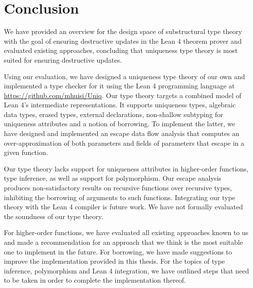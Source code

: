 \chapter{Conclusion}\label{sec:conclusion}
We have provided an overview for the design space of substructural type theory with the goal of ensuring destructive updates in the Lean 4 theorem prover and evaluated existing approaches, concluding that uniqueness type theory is most suited for ensuring destructive updates. 

Using our evaluation, we have designed a uniqueness type theory of our own and implemented a type checker for it using the Lean 4 programming language at \url{https://github.com/mhuisi/Uniq}. Our type theory targets a combined model of Lean 4's intermediate representations. It supports uniqueness types, algebraic data types, erased types, external declarations, non-shallow subtyping for uniqueness attributes and a notion of borrowing. To implement the latter, we have designed and implemented an escape data flow analysis that computes an over-approximation of both parameters and fields of parameters that escape in a given function.

Our type theory lacks support for uniqueness attributes in higher-order functions, type inference, as well as support for polymorphism. Our escape analysis produces non-satisfactory results on recursive functions over recursive types, inhibiting the borrowing of arguments to such functions. Integrating our type theory with the Lean 4 compiler is future work. We have not formally evaluated the soundness of our type theory.

For higher-order functions, we have evaluated all existing approaches known to us and made a recommendation for an approach that we think is the most suitable one to implement in the future. For borrowing, we have made suggestions to improve the implementation provided in this thesis. For the topics of type inference, polymorphism and Lean 4 integration, we have outlined steps that need to be taken in order to complete the implementation thereof.